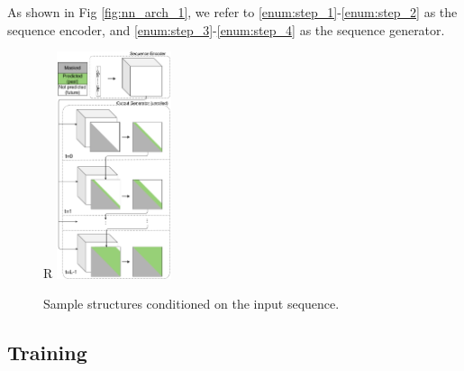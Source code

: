 \documentclass{article}
\begin{document}
As shown in Fig \ref{fig:nn_arch_1}, we refer to \ref{enum:step_1}-\ref{enum:step_2} as the sequence encoder,
and \ref{enum:step_3}-\ref{enum:step_4} as the sequence generator.



%


\begin{figure}{R}
        \centering
        \includegraphics[width=0.3\textwidth]{plot/nn_arch_2.pdf}
        \caption{Sample structures conditioned on the input sequence.}
        \label{fig:nn_arch_2}
        \centering
\end{figure}




\subsection{Training}
\end{document}
